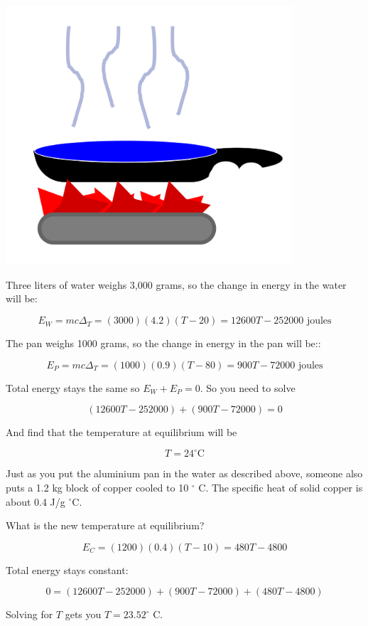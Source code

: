 \includegraphics[width=0.8\textwidth]{Specific_Heat_Diagram.png}



Three liters of water weighs 3,000 grams, so the
change in energy in the water will be:

$$E_W = m c \Delta_T = (3000)(4.2)(T - 20) = 12600T - 252000 \text{ joules}$$ 

The pan weighs 1000 grams, so the change in energy in the pan will be::

$$E_P = m c \Delta_T = (1000)(0.9)(T - 80) = 900T - 72000 \text{ joules}$$

Total energy stays the same so $E_W + E_P = 0$.  So you need to solve

$$(12600T - 252000) + (900T - 72000) = 0$$

And find that the temperature at equilibrium will be

$$T = 24^\circ \text{C}$$

\begin{Exercise}[title={Thermal Equilibrium}, label=thermal_equilibrium]

Just as you put the aluminium pan in the water as described above,
someone also puts a 1.2 kg block of copper cooled to 10 $^\circ$ C.
The specific heat of solid copper is about 0.4 J/g $^\circ$C.

What is the new temperature at equilibrium?

\end{Exercise}
\begin{Answer}[ref=thermal_equilibrium]

  $$E_C = (1200)(0.4)(T - 10) = 480T - 4800$$

Total energy stays constant:

$$0 = (12600T - 252000) + (900T - 72000) + (480T - 4800)$$

Solving for $T$ gets you $T = 23.52^\circ$ C.

\end{Answer}

